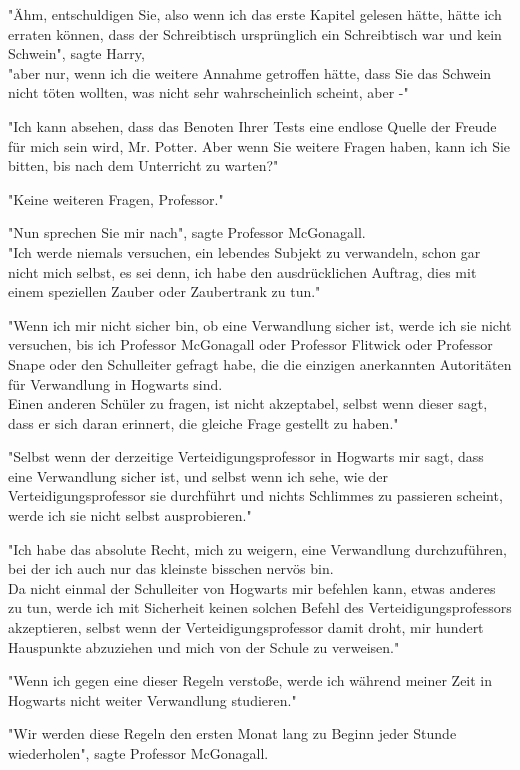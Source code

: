 {"Ähm, entschuldigen Sie, also wenn ich das erste Kapitel gelesen hätte, hätte ich erraten können, dass der Schreibtisch ursprünglich ein Schreibtisch war und kein Schwein", sagte Harry,\\ "aber nur, wenn ich die weitere Annahme getroffen hätte, dass Sie das Schwein nicht töten wollten, was nicht sehr wahrscheinlich scheint, aber -"

"Ich kann absehen, dass das Benoten Ihrer Tests eine endlose Quelle der Freude für mich sein wird, Mr. Potter. Aber wenn Sie weitere Fragen haben, kann ich Sie bitten, bis nach dem Unterricht zu warten?"

"Keine weiteren Fragen, Professor."

"Nun sprechen Sie mir nach", sagte Professor McGonagall.\\ "Ich werde niemals versuchen, ein lebendes Subjekt zu verwandeln, schon gar nicht mich selbst, es sei denn, ich habe den ausdrücklichen Auftrag, dies mit einem speziellen Zauber oder Zaubertrank zu tun."

"Wenn ich mir nicht sicher bin, ob eine Verwandlung sicher ist, werde ich sie nicht versuchen, bis ich Professor McGonagall oder Professor Flitwick oder Professor Snape oder den Schulleiter gefragt habe, die die einzigen anerkannten Autoritäten für Verwandlung in Hogwarts sind.\\ Einen anderen Schüler zu fragen, ist nicht akzeptabel, selbst wenn dieser sagt, dass er sich daran erinnert, die gleiche Frage gestellt zu haben."

"Selbst wenn der derzeitige Verteidigungsprofessor in Hogwarts mir sagt, dass eine Verwandlung sicher ist, und selbst wenn ich sehe, wie der Verteidigungsprofessor sie durchführt und nichts Schlimmes zu passieren scheint, werde ich sie nicht selbst ausprobieren."

"Ich habe das absolute Recht, mich zu weigern, eine Verwandlung durchzuführen, bei der ich auch nur das kleinste bisschen nervös bin.\\ Da nicht einmal der Schulleiter von Hogwarts mir befehlen kann, etwas anderes zu tun, werde ich mit Sicherheit keinen solchen Befehl des Verteidigungsprofessors akzeptieren, selbst wenn der Verteidigungsprofessor damit droht, mir hundert Hauspunkte abzuziehen und mich von der Schule zu verweisen."

"Wenn ich gegen eine dieser Regeln verstoße, werde ich während meiner Zeit in Hogwarts nicht weiter Verwandlung studieren."

"Wir werden diese Regeln den ersten Monat lang zu Beginn jeder Stunde wiederholen", sagte Professor McGonagall.

}
